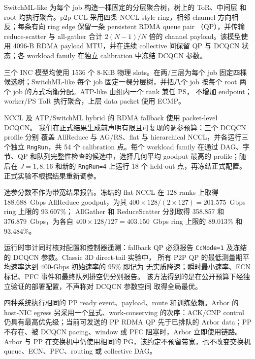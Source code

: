 SwitchML-like 为每个 job 构造一棵固定的分层聚合树，树上的 ToR、中间层
和 root 均执行聚合。p2p-CCL 采用四条 NCCL-style ring，相邻 channel
方向相反；每条有向 ring edge 保留一条 persistent RDMA queue pair
（QP），并传输 reduce-scatter 与 all-gather 合计 $2(N-1)/N$ 倍的
channel payload。该模型使用 4096-B RDMA payload MTU，并在连续
collective 间保留 QP 与 DCQCN 状态；各 workload family 在独立
calibration 中冻结 DCQCN 参数。

三个 INC 模型均使用 1536 个 8-KiB 物理 slots。\sysname 在两/三层为每个
job 固定四棵候选树；SwitchML-like 每个 job 固定一棵分层树，并把八个 job
按每个 root 两个 job 的方式均衡分配。ATP-like 由组内一个 rank 兼任 PS，
不增加 endpoint；worker/PS ToR 执行聚合，上层 data packet 使用 ECMP。

NCCL 及 ATP/SwitchML hybrid 的 RDMA fallback 使用 packet-level DCQCN。
我们在正式结果生成前声明有限且可复现的调参预算：三个 DCQCN profile 分别
覆盖 AllReduce 与 AG/RS、flat 与 hierarchical NCCL，并各运行三个独立
\texttt{RngRun}，共 54 个 calibration 点。每个 workload family 在通过
DAG、字节、QP 和队列完整性检查的候选中，选择几何平均 goodput 最高的
profile；随后在 $J=1,8,16$ 和新的 \texttt{RngRun=4} 上运行 18 个 held-out
点，再冻结正式配置。正式实验不根据结果重新调参。

选参分数不作为带宽结果报告。冻结的 flat NCCL 在 128 ranks 上取得
188.688~Gbps AllReduce goodput，为其
$400\times128/(2\times127)=201.575$~Gbps ring 上限的 93.607\%；
AllGather 和 ReduceScatter 分别取得 358.857 和 376.879~Gbps，为各自
$400\times128/127=403.150$~Gbps ring 上限的 89.013\% 和 93.484\%。

运行时审计同时核对配置和控制器遥测：fallback QP 必须报告
\texttt{CcMode=1} 及冻结的 DCQCN 参数。Classic 3D direct-tail 实验中，
所有 P2P QP 的最低测量期平均速率达到 400-Gbps 初始速率的 95\% 即记为
无实质降速；瞬时最小速率、ECN 标记、PFC 事件和最终队列排空仍分别报告。
该方法得到的是在公开预算下经独立验证的部署配置，不声称对 DCQCN 参数空间
取得全局最优。

\label{app:classic-pp-scheduler}
四种系统执行相同的 PP ready event、payload、route 和训练依赖。Arbor 的
host-NIC egress 另采用一个显式、work-conserving 的次序：ACK/CNP control
仍具有最高优先级；当前可发送的 PP RDMA QP 先于已排队的 Arbor data；PP
不存在、被 DCQCN pacing、window 或 PFC 阻塞时，Arbor 立即使用链路。
Arbor 与 PP 在交换机中仍使用相同的 PG，该约定不预留带宽，也不改变交换机
queue、ECN、PFC、routing 或 collective DAG。

